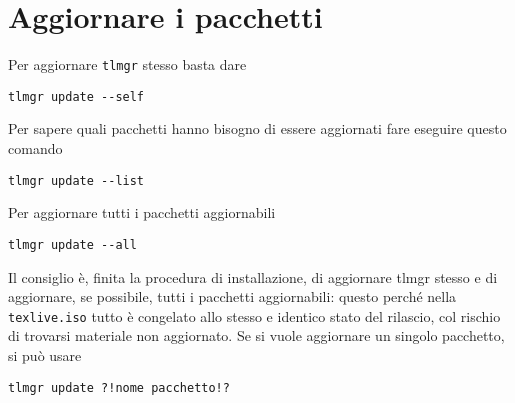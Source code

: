 
\section{Aggiornare i pacchetti}


Per aggiornare \lstinline£tlmgr£ stesso basta dare
\begin{lstlisting}
tlmgr update --self
\end{lstlisting}
Per sapere quali pacchetti hanno bisogno di essere aggiornati fare eseguire questo comando
\begin{lstlisting}
tlmgr update --list
\end{lstlisting}
Per aggiornare tutti i pacchetti aggiornabili
\begin{lstlisting}
tlmgr update --all
\end{lstlisting}
Il consiglio è, finita la procedura di installazione, di aggiornare {\sf tlmgr} stesso e di aggiornare, se possibile, tutti i pacchetti aggiornabili: questo perché nella \lstinline£texlive.iso£ tutto è congelato allo stesso e identico stato del rilascio, col rischio di trovarsi materiale non aggiornato. Se si vuole aggiornare un singolo pacchetto, si può usare
\begin{lstlisting}
tlmgr update ?!nome pacchetto!?
\end{lstlisting}

